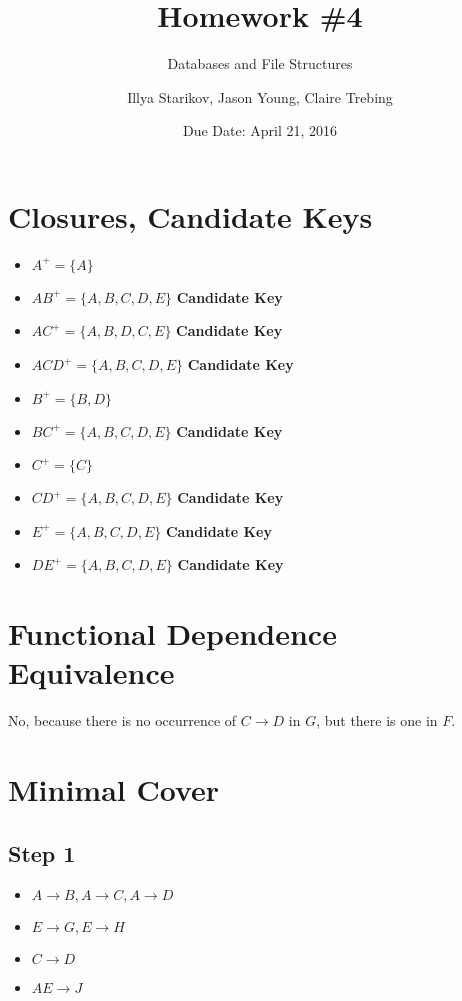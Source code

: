 \documentclass{scrartcl}
\title{Homework \#4}
\subtitle{Databases and File Structures}
\date{Due Date: April 21, 2016}
\author{Illya Starikov, Jason Young, Claire Trebing}
\begin{document}
\maketitle

\section{Closures, Candidate Keys}
\begin{itemize}
    \item $A^+ = \{ A \}$
    \item $AB^+ = \{ A, B, C, D, E \}$ \textbf{Candidate Key}
    \item $AC^+ = \{ A, B, D, C, E \}$ \textbf{Candidate Key}
    \item $ACD^+ = \{ A, B, C, D, E \}$ \textbf{Candidate Key}
    \item $B^+ = \{ B, D \}$
    \item $BC^+ = \{ A, B, C, D, E\}$ \textbf{Candidate Key}
    \item $C^+ = \{ C \}$
    \item $CD^+ = \{ A, B, C, D, E \}$ \textbf{Candidate Key}
    \item $E^+ = \{ A, B, C, D, E \}$ \textbf{Candidate Key}
    \item $DE^+ = \{ A, B, C, D, E \}$ \textbf{Candidate Key}
\end{itemize}

\section{Functional Dependence Equivalence}
No, because there is no occurrence of $C \rightarrow D$ in $G$, but there is one in $F$.


\section{Minimal Cover}
\subsection*{Step 1}
\begin{itemize}
    \item $A \rightarrow B, A \rightarrow C, A \rightarrow D$
    \item $E \rightarrow G, E \rightarrow H$
    \item $C \rightarrow D$
    \item $AE \rightarrow J$
\end{itemize}
\end{document}
